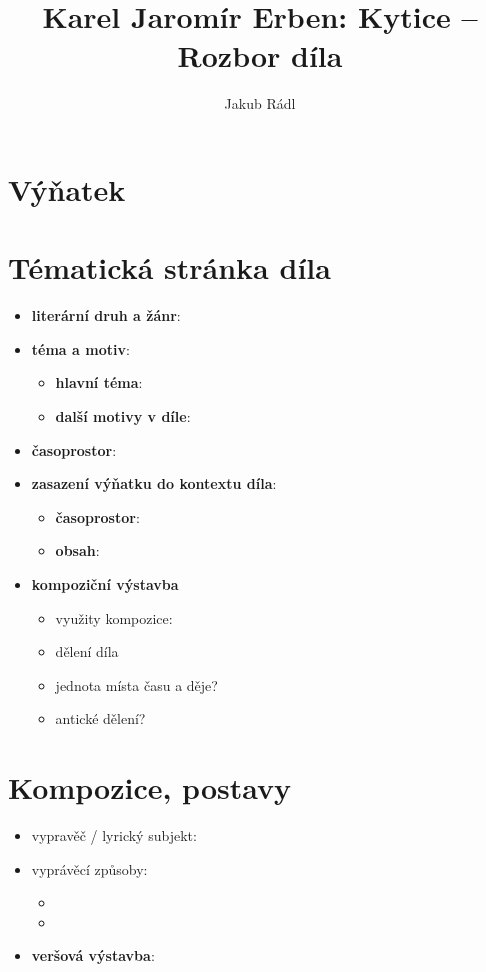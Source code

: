 \documentclass[10pt,a4paper]{article}
\date{}
\author{Jakub Rádl}
\title{Karel Jaromír Erben: Kytice -- Rozbor díla}
\begin{document}
\maketitle

\section*{Výňatek}

\section*{Tématická stránka díla}
\begin{itemize}
\item \textbf{literární druh a žánr}:
\item \textbf{téma a motiv}:
	\begin{itemize}
	\item \textbf{hlavní téma}:
	\item \textbf{další motivy v díle}:
	\end{itemize}
\item \textbf{časoprostor}:
\item \textbf{zasazení výňatku do kontextu díla}:
	\begin{itemize}
	\item \textbf{časoprostor}:
	\item \textbf{obsah}: 
	\end{itemize}
\item \textbf{kompoziční výstavba}
	\begin{itemize}
	\item využity kompozice: 
	\item dělení díla
	\item jednota místa času a děje?
	\item antické dělení?
	\end{itemize}
\end{itemize}
\section*{Kompozice, postavy}
\begin{itemize}
\item vypravěč / lyrický subjekt:
\item vyprávěcí způsoby:
	\begin{itemize}
	\item 
	\item
	\end{itemize}
\item \textbf{veršová výstavba}:	
\end{itemize}
\end{document}
